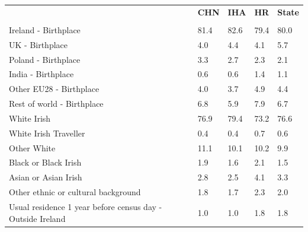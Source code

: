 \documentclass{article}
\begin{document}
\pagebreak
\begin{table}[h]	
\centering
		\begin{tabular}{KTTTT}
  \hline
& \textbf{CHN} & \textbf{IHA} & \textbf{HR}& \textbf{State}\\ 
  \hline
    \\ 
    \hline
Ireland - Birthplace & 81.4& 82.6& 79.4& 80.0\\
UK - Birthplace & 4.0& 4.4& 4.1& 5.7\\
Poland - Birthplace & 3.3& 2.7& 2.3& 2.1\\
India - Birthplace & 0.6& 0.6& 1.4& 1.1\\
Other EU28 - Birthplace & 4.0& 3.7& 4.9& 4.4\\
Rest of world - Birthplace & 6.8& 5.9& 7.9& 6.7\\
    \hline
White Irish & 76.9& 79.4& 73.2& 76.6\\
White Irish Traveller & 0.4& 0.4& 0.7& 0.6\\
Other White & 11.1& 10.1& 10.2&  9.9\\
Black or Black Irish & 1.9& 1.6& 2.1& 1.5\\
Asian or Asian Irish & 2.8& 2.5& 4.1& 3.3\\
Other ethnic or cultural background & 1.8& 1.7& 2.3& 2.0\\
    \hline
Usual residence 1 year before census day - Outside Ireland & 1.0& 1.0& 1.8& 1.8\\


\end{tabular}
\end{table}
\end{document}
